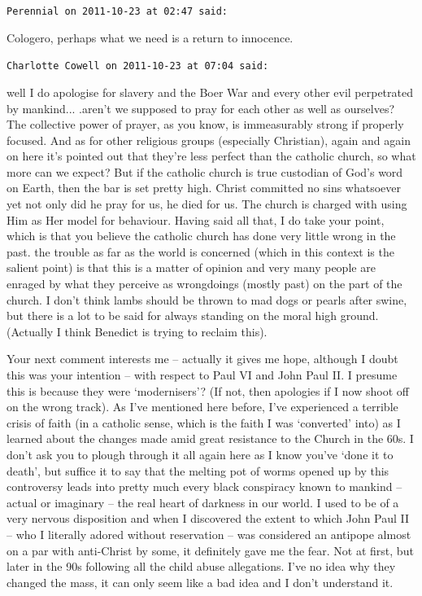 \begin{footnotesize}
\begin{sffamily}
\hfill

\texttt{Perennial on 2011-10-23 at 02:47 said:}

Cologero, perhaps what we need is a return to innocence.

\hfill

\texttt{Charlotte Cowell on 2011-10-23 at 07:04 said:}

well I do apologise for slavery and the Boer War and every other evil perpetrated by mankind... .aren't we supposed to pray for each other as well as ourselves? The collective power of prayer, as you know, is immeasurably strong if properly focused. And as for other religious groups (especially Christian), again and again on here it's pointed out that they're less perfect than the catholic church, so what more can we expect? But if the catholic church is true custodian of God's word on Earth, then the bar is set pretty high. Christ committed no sins whatsoever yet not only did he pray for us, he died for us. The church is charged with using Him as Her model for behaviour. Having said all that, I do take your point, which is that you believe the catholic church has done very little wrong in the past. the trouble as far as the world is concerned (which in this context is the salient point) is that this is a matter of opinion and very many people are enraged by what they perceive as wrongdoings (mostly past) on the part of the church. I don't think lambs should be thrown to mad dogs or pearls after swine, but there is a lot to be said for always standing on the moral high ground. (Actually I think Benedict is trying to reclaim this).

Your next comment interests me -- actually it gives me hope, although I doubt this was your intention -- with respect to Paul VI and John Paul II. I presume this is because they were `modernisers'? (If not, then apologies if I now shoot off on the wrong track). As I've mentioned here before, I've experienced a terrible crisis of faith (in a catholic sense, which is the faith I was `converted' into) as I learned about the changes made amid great resistance to the Church in the 60s. I don't ask you to plough through it all again here as I know you've `done it to death', but suffice it to say that the melting pot of worms opened up by this controversy leads into pretty much every black conspiracy known to mankind -- actual or imaginary -- the real heart of darkness in our world. I used to be of a very nervous disposition and when I discovered the extent to which John Paul II -- who I literally adored without reservation -- was considered an antipope almost on a par with anti-Christ by some, it definitely gave me the fear. Not at first, but later in the 90s following all the child abuse allegations. I've no idea why they changed the mass, it can only seem like a bad idea and I don't understand it.


\end{sffamily}
\end{footnotesize}
